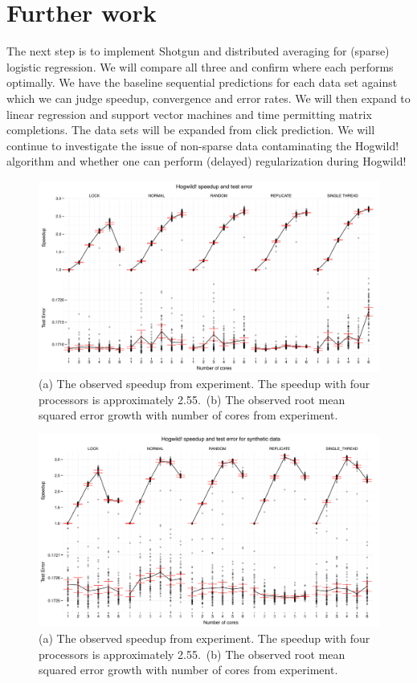 \documentclass{article} %
\begin{document}
\section{Further work}
The next step is to implement Shotgun and distributed averaging for (sparse) logistic regression. We will compare all three and confirm where each performs optimally. We have the baseline sequential predictions for each data set against which we can judge speedup, convergence and error rates. We will then expand to linear regression and support vector machines and time permitting matrix completions. The data sets will be expanded from click prediction. We will continue to investigate the issue of non-sparse data contaminating the Hogwild! algorithm and whether one can perform (delayed) regularization during Hogwild!

\begin{figure}[htb]
\centering
\includegraphics[width=\textwidth]{../../speedup_errors_complete}
\caption{(a) The observed speedup from experiment. The speedup with four processors is approximately 2.55.~(b) The observed root mean squared error growth with number of cores from experiment.}
\label{res}
\end{figure}

\begin{figure}[htb]
\centering
\includegraphics[width=\textwidth]{../../speedup_errors_complete_syn}
\caption{(a) The observed speedup from experiment. The speedup with four processors is approximately 2.55.~(b) The observed root mean squared error growth with number of cores from experiment.}
\label{res}
\end{figure}
\end{document}
